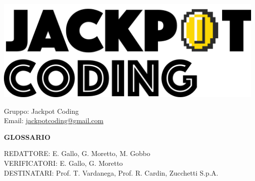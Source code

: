 \documentclass[5pt]{article}
\begin{document}
\begin{minipage}[t]{0.50\textwidth}
    \begin{flushleft}
        \hspace{10pt}
        \includegraphics[scale=0.65]{jackpot-logo.png} 
    \end{flushleft}
\end{minipage}
\hspace{-60pt} %
\begin{flushright}
    \begin{minipage}[t]{0.50\textwidth}
        \begin{flushright}
            Gruppo: {\Large Jackpot Coding}\\
            Email: \href{mailto:jackpotcoding@gmail.com}{jackpotcoding@gmail.com}
        \end{flushright}
    \end{minipage}
\end{flushright}

\vspace{24pt}

\begin{center}
    \textbf{\LARGE GLOSSARIO}
\end{center}

\vspace{13pt}

\begin{flushleft}
    \begin{spacing}{1.5}
        REDATTORE: E. Gallo, G. Moretto, M. Gobbo\\%
        VERIFICATORI: E. Gallo, G. Moretto \\
        \vspace{7pt}
        DESTINATARI: Prof. T. Vardanega, Prof. R. Cardin, Zucchetti S.p.A.\\%
    \end{spacing}
\end{flushleft}
\end{document}
